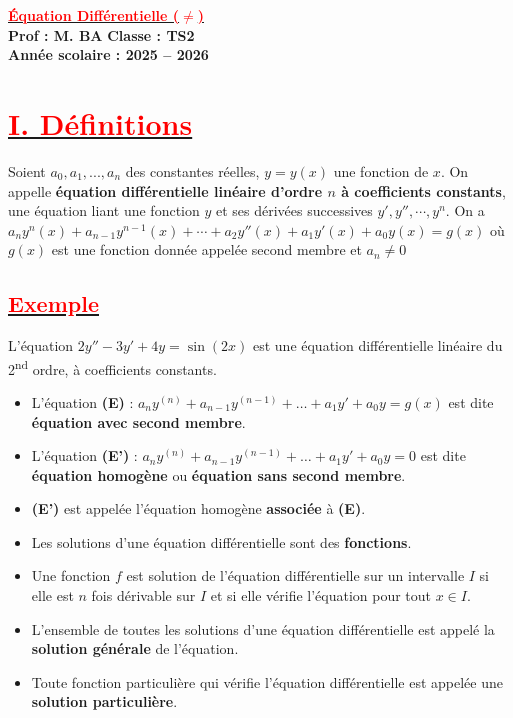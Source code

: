 \documentclass[12pt,a4paper]{article}
\begin{document}
\begin{center}
    \Large\textbf{\underline{\textcolor{red}{Équation Différentielle (\(\neq\))}}}\\[-0.1cm]
    \normalsize\textbf{Prof : M. BA} \hfill \textbf{Classe : TS2}\\[-0.1cm]
    \textbf{Année scolaire : 2025 -- 2026}
\end{center}

\section*{\underline{\textbf{\textcolor{red}{I. Définitions}}}}
Soient $a_{0},a_{1},...,a_{n}$ des constantes réelles, $y=y(x)$ une fonction de 
$x$. On appelle \textbf{équation différentielle linéaire d'ordre $n$ à coefficients constants}, une équation liant une fonction $y$ et ses dérivées successives $y',y'',\cdots , y^{n}$. On a $a_{n}y^{n}(x)+a_{n-1}y^{n-1}(x)+\cdots +a_{2}y''(x)+a_{1}y'(x)+a_{0}y(x)=g(x)$ où $g(x)$ est une fonction donnée appelée second membre et $a_{n}\neq 0$

\subsection*{\underline{\textbf{\textcolor{red}{Exemple}}}}
L'équation $2y'' - 3y' + 4y = \sin(2x)$ est une équation différentielle linéaire du 2\textsuperscript{nd} ordre, à coefficients constants.

\begin{itemize}
    \item L'équation \textbf{(E)} : $a_{n}y^{(n)} + a_{n-1}y^{(n-1)} + \dots + a_{1}y' + a_{0}y = g(x)$ est dite  \textbf{équation avec second membre}. 
    
    \item L'équation \textbf{(E')} : $a_{n}y^{(n)} + a_{n-1}y^{(n-1)} + \dots + a_{1}y' + a_{0}y = 0$ est dite \textbf{équation homogène} ou \textbf{équation sans second membre}. 	   
    
    \item \textbf{(E')} est appelée l'équation homogène \textbf{associée} à \textbf{(E)}.
    
    \item Les solutions d'une équation différentielle sont des \textbf{fonctions}.
    
    \item Une fonction $f$ est solution de l'équation différentielle sur un intervalle $I$ si elle est $n$ fois dérivable sur $I$ et si elle vérifie l'équation pour tout $x \in I$.
    
    \item L'ensemble de toutes les solutions d'une équation différentielle est appelé la \textbf{solution générale} de l'équation.
    
    \item Toute fonction particulière qui vérifie l'équation différentielle est appelée une \textbf{solution particulière}.
\end{itemize}
\end{document}

